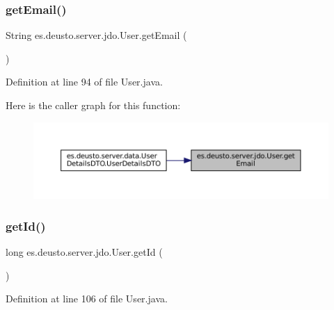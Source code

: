 \subsubsection{\texorpdfstring{getEmail()}{getEmail()}}
{\footnotesize\ttfamily String es.\+deusto.\+server.\+jdo.\+User.\+get\+Email (\begin{DoxyParamCaption}{ }\end{DoxyParamCaption})}



Definition at line 94 of file User.\+java.

Here is the caller graph for this function\+:
\nopagebreak
\begin{figure}[H]
\begin{center}
\leavevmode
\includegraphics[width=350pt]{classes_1_1deusto_1_1server_1_1jdo_1_1_user_aa1ba6d9e3d0572b90dac6ff627ee3f95_icgraph}
\end{center}
\end{figure}
\mbox{\label{classes_1_1deusto_1_1server_1_1jdo_1_1_user_ac116b1ec523da06c6776eaa76c910125}} 
\subsubsection{\texorpdfstring{getId()}{getId()}}
{\footnotesize\ttfamily long es.\+deusto.\+server.\+jdo.\+User.\+get\+Id (\begin{DoxyParamCaption}{ }\end{DoxyParamCaption})}



Definition at line 106 of file User.\+java.

